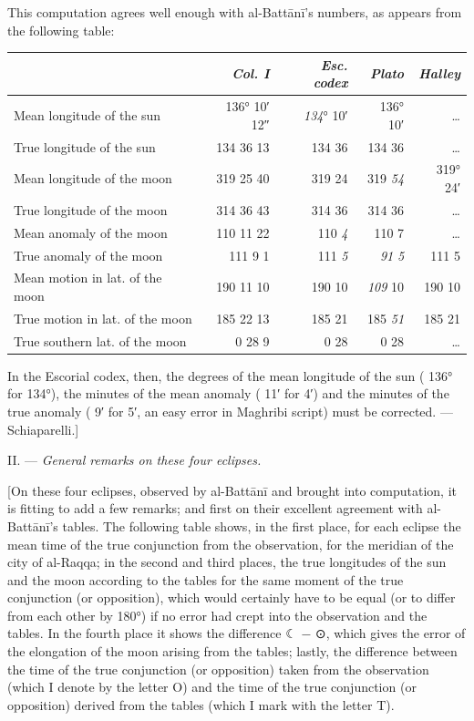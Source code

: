 \documentclass[11pt]{article}
\newcommand{\Pg}[1]{\marginpar{\footnotesize\color{gray}#1}}
\begin{document}
\par This computation agrees well enough with al-Battānī's numbers, as appears from the following table:\par
\Pg{I 232}\begin{center}\small\begin{tabular}{>{\raggedright\arraybackslash}p{50mm}rrrr}
 & \emph{Col. I} & \emph{Esc. codex} & \emph{Plato} & \emph{Halley} \\
\midrule
Mean longitude of the sun & 136° 10′ 12″ & \emph{134}° 10′ & 136° 10′ & … \\
True longitude of the sun & 134 36 13 & 134 36 & 134 36 & … \\
Mean longitude of the moon & 319 25 40 & 319 24 & 319 \emph{54} & 319° 24′ \\
True longitude of the moon & 314 36 43 & 314 36 & 314 36 & … \\
Mean anomaly of the moon & 110 11 22 & 110 \emph{4} & 110 7 & … \\
True anomaly of the moon & 111 9 1 & 111 \emph{5} & \emph{91} \emph{5} & 111 5 \\
Mean motion in lat. of the moon & 190 11 10 & 190 10 & \emph{109} 10 & 190 10 \\
True motion in lat. of the moon & 185 22 13 & 185 21 & 185 \emph{51} & 185 21 \\
True southern lat. of the moon & 0 28 9 & 0 28 & 0 28 & … \\
\end{tabular}\end{center}
\par In the Escorial codex, then, the degrees of the mean longitude of the sun ( 136° for  134°), the minutes of the mean anomaly ( 11′ for  4′) and the minutes of the true anomaly ( 9′ for  5′, an easy error in Maghribi script) must be corrected. — Schiaparelli.]\par
\par\begin{center}II. — \emph{General remarks on these four eclipses.}\end{center}
\par [On these four eclipses, observed by al-Battānī and brought into computation, it is fitting to add a few remarks; and first on their excellent agreement with al-Battānī's tables. The following table shows, in the first place, for each eclipse the mean time of the true conjunction from the observation, for the meridian of the city of al-Raqqa; in the second and third places, the true longitudes of the sun and the moon according to the tables for the same moment of the true conjunction (or opposition), which would certainly have to be equal (or to differ from each other by 180°) if no error had crept into the observation and the tables. In the fourth place it shows the difference {\MoonFont\upshape ☾} − {\MoonFont\upshape ⊙}, which gives the error of the elongation of the moon arising from the tables; lastly, the difference between the time of the true conjunction (or opposition) taken from the observation (which I denote by the letter O) and the time of the true conjunction (or opposition) derived from the tables (which I mark with the letter T).\par
\end{document}
